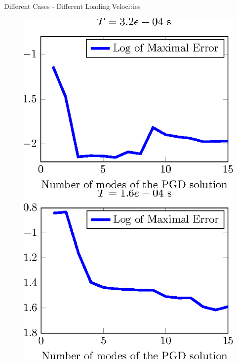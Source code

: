 \documentclass[10pt,a4paper]{beamer}
\begin{document}
\begin{frame}{Different Cases - Different Loading Velocities}
	\begin{figure}
		\begin{minipage}{0.24\linewidth}
			\includegraphics[width=1\linewidth]{Error.CalculSchem3.T4.tikz.eps}
		\end{minipage}
		\begin{minipage}{0.24\linewidth}
			\includegraphics[width=1\linewidth]{Error.CalculSchem3.T3.tikz.eps}
		\end{minipage}
		\begin{minipage}{0.24\linewidth}

\end{minipage}
\end{figure}
\end{frame}
\end{document}
